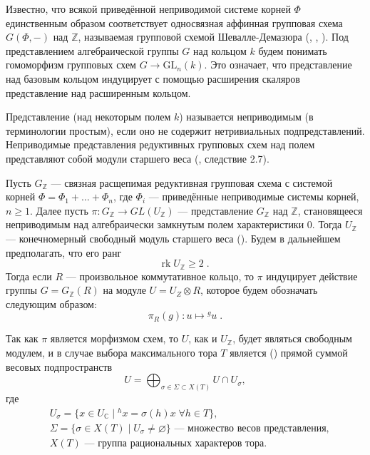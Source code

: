 \documentclass[12pt]{matmex-diploma}
\theoremstyle{mystyleni}
\theoremstyle{mystyle}
\newcommand{\Z}{\mathbb{Z}}
\renewcommand{\C}{\mathbb{C}}
\renewcommand{\ge}{\geqslant}
\begin{document}
Известно, что всякой приведённой неприводимой системе корней $\Phi$ единственным образом соответствует односвязная аффинная групповая схема $G(\Phi,-)$ над $\Z$, называемая групповой схемой Шевалле-Демазюра (\cite{Plotkin1998}, \cite{Steinberg2016}, \cite{Chevalley1960-1961}).
Под представлением алгебраической группы $G$ над кольцом $k$ будем понимать гомоморфизм групповых схем $G \to \mathrm{GL}_n(k)$. Это означает, что представление над базовым кольцом индуцирует с помощью расширения скаляров представление над расширенным кольцом.

Представление (над некоторым полем $k$) называется неприводимым (в терминологии \cite{Milne2017} простым), если оно не содержит нетривиальных подпредставлений.
Неприводимые представления редуктивных групповых схем над полем представляют собой модули старшего веса (\cite{Jantzen1987}, следствие 2.7).




Пусть $G_\Z$ --- связная расщепимая редуктивная групповая схема с системой корней $\Phi = \Phi_1 + \dots + \Phi_n$, где $\Phi_i$ --- приведённые неприводимые системы корней, $n \ge 1$.
\linebreak
Далее пусть $\pi:G_\Z \to GL(U_\Z)$ --- представление $G_\Z$ над $\Z$, становящееся неприводимым над алгебраически замкнутым полем характеристики $0$. Тогда $U_\Z$ --- конечномерный свободный модуль старшего веса (\cite{Conrad11reductivegroup}). Будем в дальнейшем предполагать, что его ранг
\begin{equation*}
\mathrm{rk} \; U_\Z \ge 2 \;.
\end{equation*}
Тогда если $R$ --- произвольное коммутативное кольцо, то $\pi$ индуцирует действие группы $G=G_\Z(R)$ на модуле $U = U_Z \otimes R$,  которое будем обозначать следующим образом:
$$ \pi_R(g) : u \mapsto {}^g u \; . $$

Так как $\pi$ является морфизмом схем, то $U$, как и $U_\Z$, будет являться свободным модулем, и в случае выбора максимального тора $T$ является (\citep{Borel1970}) прямой суммой весовых подпространств
$$U=\bigoplus_{\sigma \in \Sigma \subset X(T)} {U \cap U_\sigma} ,$$
где
\begin{equation*}
\begin{split}
& U_\sigma = \{x \in U_\C \; | \; ^h x = \sigma(h) x \; \forall h \in T \},\\
& \Sigma = \{\sigma \in X(T) \; | \; U_\sigma \ne \varnothing\} \text{ --- множество весов представления,}\\
& X(T) \text{ --- группа рациональных характеров тора.}
\end{split}
\end{equation*}
\end{document}
